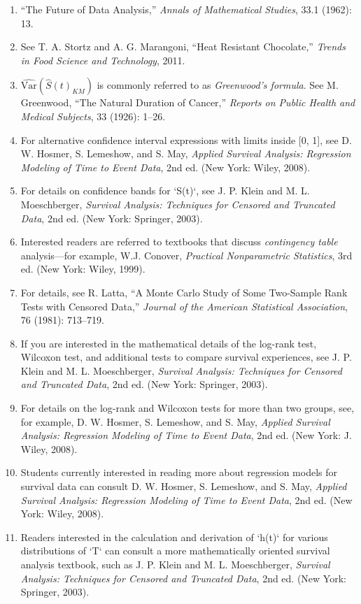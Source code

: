 \documentclass[
]{report}
\begin{document}
\begin{enumerate}

\item “The Future of Data Analysis,” \textit{Annals of Mathematical Studies}, 33.1 (1962): 13.
\item See T. A. Stortz and A. G. Marangoni, “Heat Resistant Chocolate,” \textit{Trends in Food Science and Technology}, 2011.
\item $\scriptstyle \widehat{\text{Var}}(\widehat{S}(t)_{KM})$ is commonly referred to as \textit{Greenwood’s formula}. See M. Greenwood, “The Natural Duration of Cancer,” \textit{Reports on Public Health and Medical Subjects}, 33 (1926): 1–26.
\item For alternative confidence interval expressions with limits inside [0, 1], see D. W. Hosmer, S. Lemeshow, and S. May, \textit{Applied Survival Analysis: Regression Modeling of Time to Event Data}, 2nd ed. (New York: Wiley, 2008).
\item For details on confidence bands for `S(t)`, see J. P. Klein and M. L. Moeschberger, \textit{Survival Analysis: Techniques for Censored and Truncated Data}, 2nd ed. (New York: Springer, 2003).
\item Interested readers are referred to textbooks that discuss \textit{contingency table} analysis—for example, W.J. Conover, \textit{Practical Nonparametric Statistics}, 3rd ed. (New York: Wiley, 1999).
\item For details, see R. Latta, “A Monte Carlo Study of Some Two-Sample Rank Tests with Censored Data,” \textit{Journal of the American Statistical Association}, 76 (1981): 713–719.
\item If you are interested in the mathematical details of the log-rank test, Wilcoxon test, and additional tests to compare survival experiences, see J. P. Klein and M. L. Moeschberger, \textit{Survival Analysis: Techniques for Censored and Truncated Data}, 2nd ed. (New York: Springer, 2003).
\item For details on the log-rank and Wilcoxon tests for more than two groups, see, for example, D. W. Hosmer, S. Lemeshow, and S. May, \textit{Applied Survival Analysis: Regression Modeling of Time to Event Data}, 2nd ed. (New York: J. Wiley, 2008).
\item Students currently interested in reading more about regression models for survival data can consult D. W. Hosmer, S. Lemeshow, and S. May, \textit{Applied Survival Analysis: Regression Modeling of Time to Event Data}, 2nd ed. (New York: Wiley, 2008).
\item Readers interested in the calculation and derivation of `h(t)` for various distributions of `T` can consult a more mathematically oriented survival analysis textbook, such as J. P. Klein and M. L. Moeschberger, \textit{Survival Analysis: Techniques for Censored and Truncated Data}, 2nd ed. (New York: Springer, 2003).

\end{enumerate}
\end{document}
